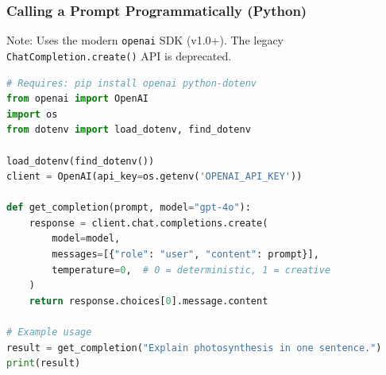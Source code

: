 \begin{frame}[fragile]\frametitle{Calling a Prompt Programmatically (Python)}

{\tiny Note: Uses the modern \texttt{openai} SDK (v1.0+). The legacy \texttt{ChatCompletion.create()} API is deprecated.}

\begin{lstlisting}[language=Python]
# Requires: pip install openai python-dotenv
from openai import OpenAI
import os
from dotenv import load_dotenv, find_dotenv

load_dotenv(find_dotenv())
client = OpenAI(api_key=os.getenv('OPENAI_API_KEY'))

def get_completion(prompt, model="gpt-4o"):
    response = client.chat.completions.create(
        model=model,
        messages=[{"role": "user", "content": prompt}],
        temperature=0,  # 0 = deterministic, 1 = creative
    )
    return response.choices[0].message.content

# Example usage
result = get_completion("Explain photosynthesis in one sentence.")
print(result)
\end{lstlisting}
		
\end{frame}
